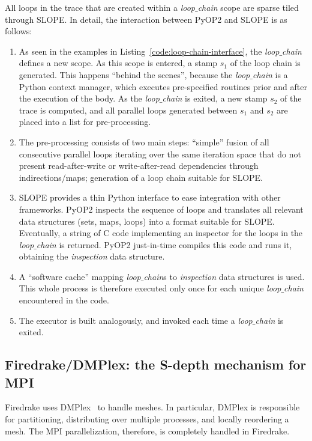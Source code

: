 All loops in the trace that are created within a {\em loop$\_$chain} scope are sparse tiled through SLOPE. In detail, the interaction between PyOP2 and SLOPE is as follows:
\begin{enumerate}
\item As seen in the examples in Listing~\ref{code:loop-chain-interface}, the {\em loop$\_$chain} defines a new scope. As this scope is entered, a stamp $s_1$ of the loop chain is generated. This happens ``behind the scenes'', because the {\em loop$\_$chain} is a Python context manager, which executes pre-specified routines prior and after the execution of the body. As the {\em loop$\_$chain} is exited, a new stamp $s_2$ of the trace is computed, and all parallel loops generated between $s_1$ and $s_2$ are placed into a list for pre-processing.
\item The pre-processing consists of two main steps: ``simple'' fusion of all consecutive parallel loops iterating over the same iteration space that do not present read-after-write or write-after-read dependencies through indirections/maps; generation of a loop chain suitable for SLOPE.
\item SLOPE provides a thin Python interface to ease integration with other frameworks. PyOP2 inspects the sequence of loops and translates all relevant data structures (sets, maps, loops) into a format suitable for SLOPE. Eventually, a string of C code implementing an inspector for the loops in the {\em loop$\_$chain} is returned. PyOP2 just-in-time compiles this code and runs it, obtaining the {\em inspection} data structure.
\item A ``software cache'' mapping {\em loop$\_$chain}s to {\em inspection} data structures is used. This whole process is therefore executed only once for each unique {\em loop$\_$chain} encountered in the code. 
\item The executor is built analogously, and invoked each time a {\em loop$\_$chain} is exited.
\end{enumerate}

\subsection{Firedrake/DMPlex: the S-depth mechanism for MPI}
\label{sec:tiling:impl-firedrake}
Firedrake uses DMPlex~\cite{dmplex} to handle meshes. In particular, DMPlex is responsible for partitioning, distributing over multiple processes, and locally reordering a mesh. The MPI parallelization, therefore, is completely handled in Firedrake.

